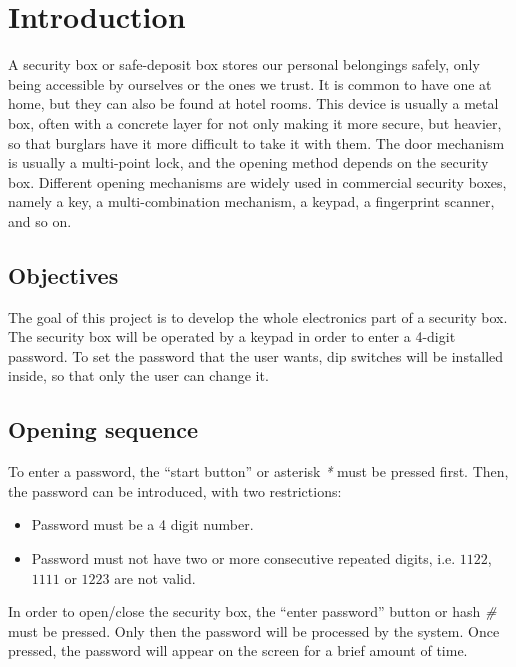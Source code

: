 \section{Introduction}

A security box or safe-deposit box stores our personal belongings safely, only being accessible by ourselves or the ones we trust. It is common to have one at home, but they can also be found at hotel rooms. This device is usually a metal box, often with a concrete layer for not only making it more secure, but heavier, so that burglars have it more difficult to take it with them. The door mechanism is usually a multi-point lock, and the opening method depends on the security box. Different opening mechanisms are widely used in commercial security boxes, namely a key, a multi-combination mechanism, a keypad, a fingerprint scanner, and so on.

\subsection{Objectives}

The goal of this project is to develop the whole electronics part of a security box. The security box will be operated by a keypad in order to enter a 4-digit password. To set the password that the user wants, dip switches will be installed inside, so that only the user can change it.

\subsection{Opening sequence}
\label{sec:OPENING_SEQ}

To enter a password, the “start button” or asterisk \emph{*} must be pressed first. Then, the password can be introduced, with two restrictions:

\begin{itemize}
    \item Password must be a 4 digit number.
    \item Password must not have two or more consecutive repeated digits, i.e. $1122$, $1111$ or $1223$ are not valid.
\end{itemize}

\vspace{-0.2cm}

\medskip

In order to open/close the security box, the “enter password” button or hash \textit{\#}  must be pressed. Only then the password will be processed by the system. Once pressed, the password will appear on the screen for a brief amount of time.\medskip

